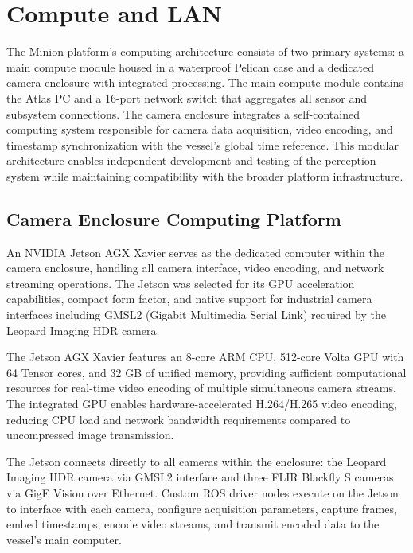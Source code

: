\documentclass{erauthesis}
\begin{document}
\section{Compute and LAN} \label{compute_lan}

The Minion platform's computing architecture consists of two primary systems: a main compute module housed in a waterproof Pelican case and a dedicated camera enclosure with integrated processing. The main compute module contains the Atlas PC and a 16-port network switch that aggregates all sensor and subsystem connections. The camera enclosure integrates a self-contained computing system responsible for camera data acquisition, video encoding, and timestamp synchronization with the vessel's global time reference. This modular architecture enables independent development and testing of the perception system while maintaining compatibility with the broader platform infrastructure.

\subsection{Camera Enclosure Computing Platform} \label{jetson_platform}

An NVIDIA Jetson AGX Xavier serves as the dedicated computer within the camera enclosure, handling all camera interface, video encoding, and network streaming operations. The Jetson was selected for its GPU acceleration capabilities, compact form factor, and native support for industrial camera interfaces including GMSL2 (Gigabit Multimedia Serial Link) required by the Leopard Imaging HDR camera.

The Jetson AGX Xavier features an 8-core ARM CPU, 512-core Volta GPU with 64 Tensor cores, and 32 GB of unified memory, providing sufficient computational resources for real-time video encoding of multiple simultaneous camera streams. The integrated GPU enables hardware-accelerated H.264/H.265 video encoding, reducing CPU load and network bandwidth requirements compared to uncompressed image transmission.

The Jetson connects directly to all cameras within the enclosure: the Leopard Imaging HDR camera via GMSL2 interface and three FLIR Blackfly S cameras via GigE Vision over Ethernet. Custom \ac{ROS} driver nodes execute on the Jetson to interface with each camera, configure acquisition parameters, capture frames, embed timestamps, encode video streams, and transmit encoded data to the vessel's main computer.

\end{document}

